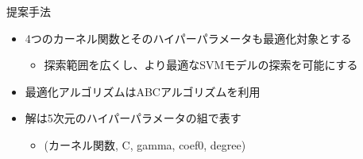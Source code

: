 \documentclass[12pt, cjk, dvipdfmx]{beamer}
\begin{document}
\begin{frame}
\begin{columns}[t]
\begin{column}{0.490\linewidth}
            \begin{mybox}{提案手法}
              \begin{itemize}
                \item 4つのカーネル関数とそのハイパーパラメータも最適化対象とする
                \begin{itemize}
                  \item 探索範囲を広くし、より最適なSVMモデルの探索を可能にする
                \end{itemize} 
                \item 最適化アルゴリズムはABCアルゴリズムを利用
                \item 解は5次元のハイパーパラメータの組で表す
                  \begin{itemize}
                    \item (カーネル関数, C, gamma, coef0, degree)    
                   

\end{itemize}
\end{itemize}
\end{mybox}
\end{column}
\end{columns}
\end{frame}
\end{document}
